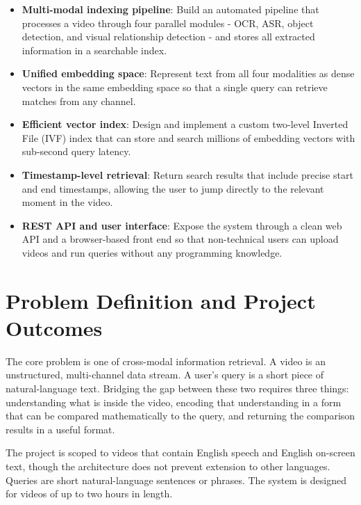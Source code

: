 \documentclass[12pt, a4paper]{report}
\begin{document}
\begin{itemize}
  \item \textbf{Multi-modal indexing pipeline}: Build an automated pipeline
    that processes a video through four parallel modules - OCR, ASR, object
    detection, and visual relationship detection - and stores all extracted
    information in a searchable index.

  \item \textbf{Unified embedding space}: Represent text from all four
    modalities as dense vectors in the same embedding space so that a single
    query can retrieve matches from any channel.

  \item \textbf{Efficient vector index}: Design and implement a custom
    two-level Inverted File (IVF) index that can store and search millions
    of embedding vectors with sub-second query latency.

  \item \textbf{Timestamp-level retrieval}: Return search results that
    include precise start and end timestamps, allowing the user to jump
    directly to the relevant moment in the video.

  \item \textbf{REST API and user interface}: Expose the system through a
    clean web API and a browser-based front end so that non-technical users
    can upload videos and run queries without any programming knowledge.
\end{itemize}

\section{Problem Definition and Project Outcomes}

The core problem is one of cross-modal information retrieval. A video is an
unstructured, multi-channel data stream. A user's query is a short piece of
natural-language text. Bridging the gap between these two requires three
things: understanding what is inside the video, encoding that understanding
in a form that can be compared mathematically to the query, and returning
the comparison results in a useful format.

The project is scoped to videos that contain English speech and English
on-screen text, though the architecture does not prevent extension to other
languages. Queries are short natural-language sentences or phrases. The
system is designed for videos of up to two hours in length.
\end{document}
